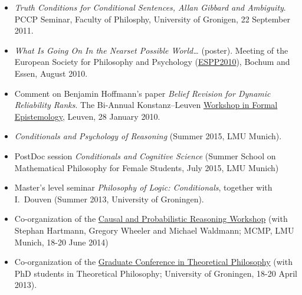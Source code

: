 \documentclass[a4paper,12pt]{article}
\begin{document}
\begin{small}
\begin{itemize}
  \item \emph{Truth Conditions for Conditional Sentences, Allan
      Gibbard and Ambiguity}. PCCP Seminar, Faculty of
    Philosphy, University of Gronigen, 22 September 2011.
    
  \item \emph{What Is Going On In the Nearset Possible World\ldots} (poster). 
  Meeting of the European Society for Philosophy and  Psychology
    (\href{http://www.ruhr-uni-bochum.de/philosophy/espp2010/index.html}{ESPP2010}),
    Bochum and Essen, August 2010.

  \item Comment on Benjamin Hoffmann's paper \emph{Belief Revision for
      Dynamic Reliability Ranks}. The Bi-Annual Konstanz--Leuven
    \href{http://formalphilosophy.org/node/580}{Workshop in Formal
      Epistemology}, Leuven, 28 January 2010.
  \end{itemize}

  



  
  
  \begin{itemize}
  \item \emph{Conditionals and Psychology of Reasoning} (Summer 2015, LMU Munich).
  \item PostDoc session \emph{Conditionals and Cognitive Science} (Summer School on Mathematical Philosophy for Female Students, July 2015, LMU Munich)
  \item Master's level seminar \emph{Philosophy of Logic:
      Conditionals}, together with I.~Douven (Summer 2013, University of Groningen).
  \end{itemize}

  
  \begin{itemize}
  \item Co-organization of the \href{http://lmu.de/cpr2015}{Causal and Probabilistic Reasoning Workshop} (with Stephan Hartmann, Gregory Wheeler and Michael Waldmann; MCMP, LMU Munich, 18-20 June 2014)
  \item Co-organization of the
    \href{http://www.philos.rug.nl/GCTP2013/}{Graduate Conference in
      Theoretical Philosophy} (with PhD students in Theoretical Philosophy; University of Groningen, 18-20 April 2013).
  \end{itemize}



\end{small}
\end{document}
